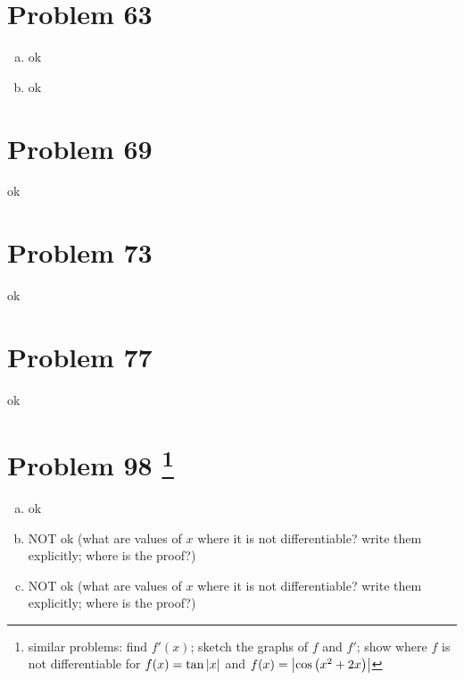 \documentclass[10pt]{article} %
\begin{document}
\section*{Problem 63 }
\begin{enumerate}[(a)]
	\item ok
	\item ok
\end{enumerate}
\section*{Problem 69 }
ok

\section*{Problem 73 }
ok
\section*{Problem 77 }
ok
\section*{Problem 98 \footnote{similar problems: find $f'(x)$; sketch the
  graphs of $f$ and $f'$; show where $f$ is not differentiable for $f(x)=\tan\left|x\right|$
  and $f(x)=\left|\cos\left( x^2
  +2x\right)\right|$}}
\begin{enumerate}[(a)]
	\item ok
	\item NOT ok (what are values of $x$ where it is not differentiable? write them explicitly;
		where is the proof?)
	\item NOT ok (what are values of $x$ where it is not differentiable? write them explicitly;
		where is the proof?)
\end{enumerate}
\end{document}
